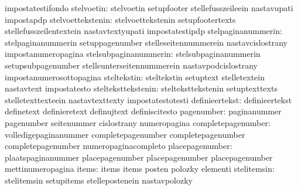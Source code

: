                                   impostatestifondo
                      stelvoetin: stelvoetin                       setupfooter
                                  stellefusszeileein               nastavupati
                                  impostapdp
               stelvoettekstenin: stelvoettekstenin                setupfootertexts
                                  stellefusszeilentextein          nastavtextyupati
                                  impostatestipdp
              stelpaginanummerin: stelpaginanummerin               setuppagenumber
                                  stelleseitennummerein            nastavcislostrany
                                  impostanumeropagina
           stelsubpaginanummerin: stelsubpaginanummerin            setupsubpagenumber
                                  stelleunterseitennummerein       nastavpodcislostrany
                                  impostanumerosottopagina
                     steltekstin: steltekstin                      setuptext
                                  stelletextein                    nastavtext
                                  impostatesto
              stelteksttekstenin: stelteksttekstenin               setuptexttexts
                                  stelletexttexteein               nastavtexttexty
                                  impostatestotesti
                  definieertekst: definieertekst                   definetext
                                  definieretext                    definujtext
                                  definiscitesto
                      pagenumber: paginanummer                     pagenumber
                                  seitenummer                      cislostrany
                                  numeropagina
              completepagenumber: volledigepaginanummer            completepagenumber
                                  completepagenumber               completepagenumber %
                                  numeropaginacompleto             %
                 placepagenumber: plaatspaginanummer               placepagenumber
                                  placepagenumber                  placepagenumber %
                                  mettinumeropagina                %
                           items: items                            items
                                  posten                           polozky
                                  elementi
                     stelitemsin: stelitemsin                      setupitems
                                  stellepostenein                  nastavpolozky
